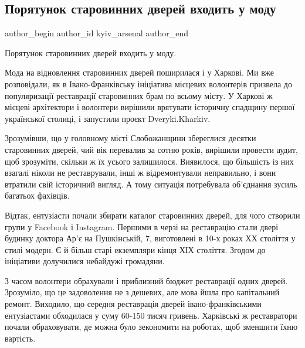  
 
 
 
 
 
\subsection{Порятунок старовинних дверей входить у моду}
\label{sec:22_12_2021.fb.kyiv_arsenal.1.dveri}
 
\ifcmt
 author_begin
   author_id kyiv_arsenal
 author_end
\fi

Порятунок старовинних дверей входить у моду.

Мода на відновлення старовинних дверей поширилася і у Харкові. Ми вже
розповідали, як в Івано-Франківську ініціатива місцевих волонтерів призвела до
популяризації реставрації старовинних брам по всьому місту. У Харкові ж місцеві
архітектори і волонтери вирішили врятувати історичну спадщину першої
української столиці, і запустили проєкт Dveryki.Kharkiv.


Зрозумівши, що у головному місті Слобожанщини збереглися десятки старовинних
дверей, чий вік перевалив за сотню років, вирішили провести аудит, щоб
зрозуміти, скільки ж їх усього залишилося. Виявилося, що більшість із них
взагалі ніколи не реставрували, інші ж відремонтували неправильно, і вони
втратили свій історичний вигляд. А тому ситуація потребувала об’єднання зусиль
багатьох фахівців. 


Відтак, ентузіасти почали збирати каталог старовинних дверей, для чого створили
групи у Facebook і Instagram. Першими в черзі на реставрацію стали двері
будинку доктора Ар'є на Пушкінській, 7, виготовлені в 10-х роках ХХ століття у
стилі модерн. Є й більш старі екземпляри кінця ХІХ століття. Згодом до
ініціативи долучилися небайдужі громадяни. 


З часом волонтери обрахували і приблизний бюджет реставрації одних дверей.
Зрозуміло, що це задоволення не з дешевих, але мова йшла про капітальний
ремонт. Виходило, що середня реставрація дверей івано-франківськими
ентузіастами обходилася у суму 60-150 тисяч гривень. Харківські ж реставратори
почали обраховувати, де можна було зекономити на роботах, щоб зменшити їхню
вартість. 

